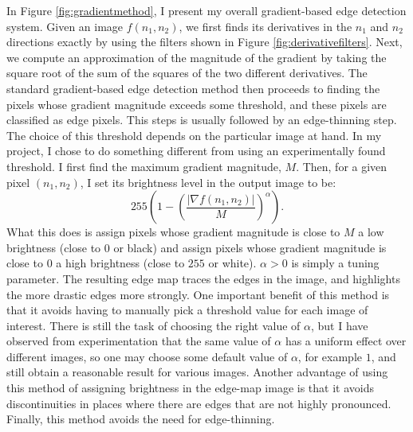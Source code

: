 \documentclass[12pt]{amsart}
\begin{document}
In Figure \ref{fig:gradientmethod}, I present my overall gradient-based edge detection system. Given an image $f(n_1, n_2)$, we first finds its derivatives in the $n_1$ and $n_2$ directions exactly by using the filters shown in Figure \ref{fig:derivativefilters}. Next, we compute an approximation of the magnitude of the gradient by taking the square root of the sum of the squares of the two different derivatives. The standard gradient-based edge detection method then proceeds to finding the pixels whose gradient magnitude exceeds some threshold, and these pixels are classified as edge pixels. This steps is usually followed by an edge-thinning step. The choice of this threshold depends on the particular image at hand. In my project, I chose to do something different from using an experimentally found threshold. I first find the maximum gradient magnitude, $M$. Then, for a given pixel $(n_1, n_2)$, I set its brightness level in the output image to be:
\begin{equation*}
255 \left(1 - \left(\frac{|\nabla f(n_1, n_2)|}{M}\right)^\alpha\right).
\end{equation*}
What this does is assign pixels whose gradient magnitude is close to $M$ a low brightness (close to $0$ or black) and assign pixels whose gradient magnitude is close to $0$ a high brightness (close to $255$ or white). $\alpha > 0$ is simply a tuning parameter. The resulting edge map traces the edges in the image, and highlights the more drastic edges more strongly. One important benefit of this method is that it avoids having to manually pick a threshold value for each image of interest. There is still the task of choosing the right value of $\alpha$, but I have observed from experimentation that the same value of $\alpha$ has a uniform effect over different images, so one may choose some default value of $\alpha$, for example $1$, and still obtain a reasonable result for various images. Another advantage of using this method of assigning brightness in the edge-map image is that it avoids discontinuities in places where there are edges that are not highly pronounced. Finally, this method avoids the need for edge-thinning.
\end{document}
